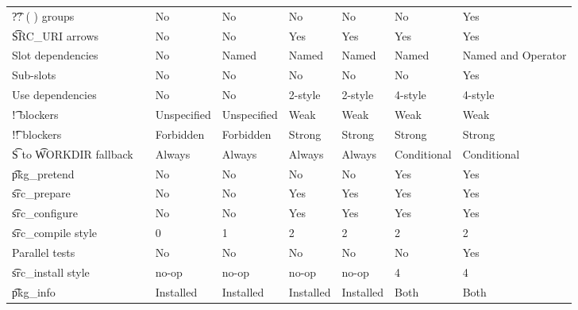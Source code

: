 \begin{landscape}
\begin{longtable}{llP{5em}P{5em}P{6em}P{6em}P{6em}P{6em}}
\t{?? ( ) groups} &  &
    No & No & No & No & No & Yes \\

\t{SRC\_URI} arrows &  &
    No & No & Yes & Yes & Yes & Yes \\

Slot dependencies &  &
    No & Named & Named & Named & Named & Named and Operator \\

Sub-slots &  &
    No & No & No & No & No & Yes \\

Use dependencies &  &
    No & No & 2-style & 2-style & 4-style & 4-style \\

\t{!} blockers &  &
    Unspecified & Unspecified & Weak & Weak & Weak & Weak \\

\t{!!} blockers &  &
    Forbidden & Forbidden & Strong & Strong & Strong & Strong \\

\t{S} to \t{WORKDIR} fallback &  &
    Always & Always & Always & Always & Conditional & Conditional \\

\t{pkg\_pretend} &  &
    No & No & No & No & Yes & Yes \\

\t{src\_prepare} &  &
    No & No & Yes & Yes & Yes & Yes \\

\t{src\_configure} &  &
    No & No & Yes & Yes & Yes & Yes \\

\t{src\_compile} style &  &
    0 & 1 & 2 & 2 & 2 & 2 \\

Parallel tests &  &
    No & No & No & No & No & Yes \\

\t{src\_install} style &  &
    no-op & no-op & no-op & no-op & 4 & 4 \\

\t{pkg\_info} &  &
    Installed & Installed & Installed & Installed & Both & Both \\


\end{longtable}
\end{landscape}

